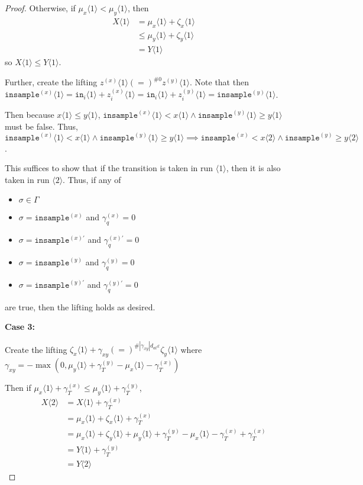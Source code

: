 \documentclass[12pt]{article}
\newcommand{\brangle}[1]{\langle#1 \rangle}
\theoremstyle{definition}
\begin{document}
\begin{proof}
    Otherwise, if $\mu_x\brangle{1}<\mu_y\brangle{1}$, then \begin{align*}
        X\brangle{1}&= \mu_x\brangle{1} + \zeta_x\brangle{1}\\
        &\leq \mu_y\brangle{1}+\zeta_y\brangle{1}\\
        &=Y\brangle{1}
    \end{align*}
    so $X\brangle{1}\leq Y\brangle{1}$.

    Further, create the lifting $z^{(x)}\brangle{1}(=)^{\#0}z^{(y)}\brangle{1}$. Note that then $\texttt{insample}^{(x)}\brangle{1}=\texttt{in}_i\brangle{1} + z_i^{(x)}\brangle{1} =\texttt{in}_i\brangle{1} + z_i^{(y)}\brangle{1}=\texttt{insample}^{(y)}\brangle{1}$.

    Then because $x\brangle{1} \leq y\brangle{1}$, $\texttt{insample}^{(x)}\brangle{1}<x\brangle{1}\land\texttt{insample}^{(y)}\brangle{1}\geq y\brangle{1}$ must be false. Thus, $\texttt{insample}^{(x)}\brangle{1}<x\brangle{1}\land\texttt{insample}^{(y)}\brangle{1}\geq y\brangle{1}\implies \texttt{insample}^{(x)}<x\brangle{2}\land\texttt{insample}^{(y)}\geq y\brangle{2}$.

    This suffices to show that if the transition is taken in run $\brangle{1}$, then it is also taken in run $\brangle{2}$. Thus, if any of \begin{itemize}
        \item $\sigma \in \Gamma$
        \item $\sigma = \texttt{insample}^{(x)}$ and $\gamma_q^{(x)}=0$ 
        \item $\sigma = \texttt{insample}^{(x)\prime}$ and $\gamma_q^{(x)\prime}=0$ 
        \item $\sigma = \texttt{insample}^{(y)}$ and $\gamma_q^{(y)}=0$
        \item $\sigma = \texttt{insample}^{(y)\prime}$ and $\gamma_q^{(y)\prime}=0$
    \end{itemize}
    are true, then the lifting holds as desired. 

    \textbf{Case 3:}
    
    Create the lifting $\zeta_x\brangle{1} + \gamma_{xy} (=)^{\#|\gamma_{xy}|d_{at}\varepsilon} \zeta_y\brangle{1}$ where $\gamma_{xy} = -\max(0, \mu_y\brangle{1}+ \gamma_T^{(y)}-\mu_x\brangle{1}-\gamma_T^{(x)})$

    Then if $\mu_x\brangle{1}+\gamma_T^{(x)}\leq \mu_y\brangle{1}+\gamma_T^{(y)}$, \begin{align*}
        X\brangle{2} &= X\brangle{1} + \gamma_T^{(x)}\\
        &=\mu_x\brangle{1} + \zeta_x\brangle{1} + \gamma_T^{(x)}\\
        &=\mu_x\brangle{1} +\zeta_y\brangle{1} + \mu_y\brangle{1}+ \gamma_T^{(y)}-\mu_x\brangle{1}-\gamma_T^{(x)} +\gamma_T^{(x)}\\
        &=Y\brangle{1} + \gamma_T^{(y)}\\
        &= Y\brangle{2}
    \end{align*}


\end{proof}
\end{document}
